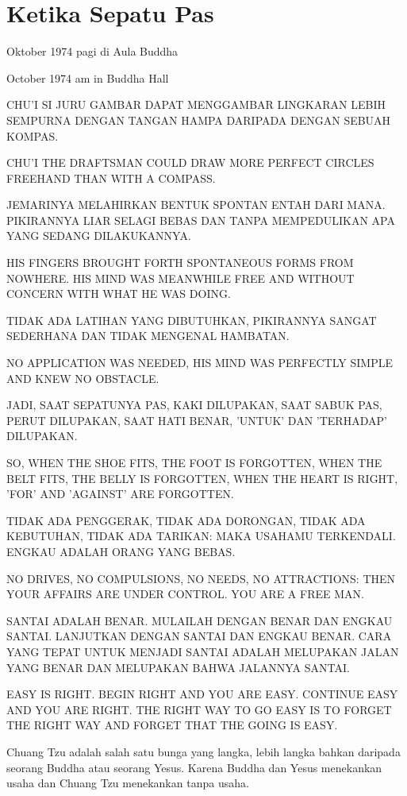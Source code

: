 \chapter{Ketika Sepatu Pas}

 Oktober 1974 pagi di Aula Buddha

 October 1974 am in Buddha Hall

\bahasa
CHU'I SI JURU GAMBAR DAPAT MENGGAMBAR LINGKARAN LEBIH SEMPURNA DENGAN TANGAN HAMPA DARIPADA DENGAN SEBUAH KOMPAS.

\english
CHU'I THE DRAFTSMAN COULD DRAW MORE PERFECT CIRCLES FREEHAND THAN WITH A COMPASS.

\bahasa
JEMARINYA MELAHIRKAN BENTUK SPONTAN ENTAH DARI MANA. PIKIRANNYA LIAR SELAGI BEBAS DAN TANPA MEMPEDULIKAN APA YANG SEDANG DILAKUKANNYA.

\english
HIS FINGERS BROUGHT FORTH SPONTANEOUS FORMS FROM NOWHERE. HIS MIND WAS MEANWHILE FREE AND WITHOUT CONCERN WITH WHAT HE WAS DOING.

\bahasa
TIDAK ADA LATIHAN YANG DIBUTUHKAN, PIKIRANNYA SANGAT SEDERHANA DAN TIDAK MENGENAL HAMBATAN.

\english
NO APPLICATION WAS NEEDED, HIS MIND WAS PERFECTLY SIMPLE AND KNEW NO OBSTACLE.

\bahasa
JADI, SAAT SEPATUNYA PAS, KAKI DILUPAKAN, SAAT SABUK PAS, PERUT DILUPAKAN, SAAT HATI BENAR, 'UNTUK' DAN 'TERHADAP' DILUPAKAN.

\english
SO, WHEN THE SHOE FITS, THE FOOT IS FORGOTTEN, WHEN THE BELT FITS, THE BELLY IS FORGOTTEN, WHEN THE HEART IS RIGHT, 'FOR' AND 'AGAINST' ARE FORGOTTEN.

\bahasa
TIDAK ADA PENGGERAK, TIDAK ADA DORONGAN, TIDAK ADA KEBUTUHAN, TIDAK ADA TARIKAN: MAKA USAHAMU TERKENDALI. ENGKAU ADALAH ORANG YANG BEBAS.

\english
NO DRIVES, NO COMPULSIONS, NO NEEDS, NO ATTRACTIONS: THEN YOUR AFFAIRS ARE UNDER CONTROL. YOU ARE A FREE MAN.

\bahasa
SANTAI ADALAH BENAR. MULAILAH DENGAN BENAR DAN ENGKAU SANTAI. LANJUTKAN DENGAN SANTAI DAN ENGKAU BENAR. CARA YANG TEPAT UNTUK MENJADI SANTAI ADALAH MELUPAKAN JALAN YANG BENAR DAN MELUPAKAN BAHWA JALANNYA SANTAI.

\english
EASY IS RIGHT. BEGIN RIGHT AND YOU ARE EASY. CONTINUE EASY AND YOU ARE RIGHT. THE RIGHT WAY TO GO EASY IS TO FORGET THE RIGHT WAY AND FORGET THAT THE GOING IS EASY.

\bahasa
Chuang Tzu adalah salah satu bunga yang langka, lebih langka bahkan daripada seorang Buddha atau seorang Yesus. Karena Buddha dan Yesus menekankan usaha dan Chuang Tzu menekankan tanpa usaha.

